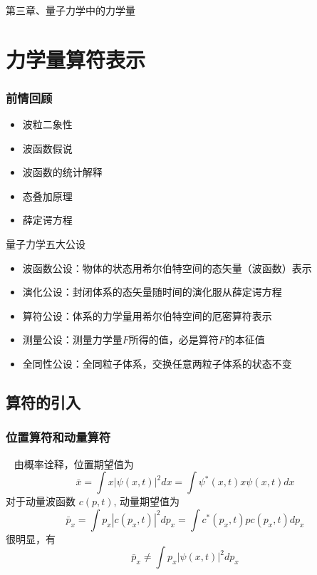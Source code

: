 \begin{frame} [plain]
    \frametitle{}
    \begin{center}
    { {\huge 第三章、量子力学中的力学量}}
    \end{center}  
    \addtocounter{framenumber}{-1}   
\end{frame}

\section{力学量算符表示}

\begin{frame}
    \frametitle{前情回顾}
    \begin{itemize}
        \item 波粒二象性
        \item 波函数假说
        \item 波函数的统计解释
        \item 态叠加原理
        \item 薛定谔方程
    \end{itemize}
\end{frame} 

\begin{frame}    
    \begin{atcbox}{量子力学五大公设}
\begin{itemize}
    \item 波函数公设：物体的状态用希尔伯特空间的态矢量（波函数）表示
    \item 演化公设：封闭体系的态矢量随时间的演化服从薛定谔方程
    \item 算符公设：体系的力学量用希尔伯特空间的厄密算符表示
    \item 测量公设：测量力学量$F$所得的值，必是算符$F$的本征值
    \item 全同性公设：全同粒子体系，交换任意两粒子体系的状态不变
\end{itemize}
    \end{atcbox}
\end{frame} 

\subsection{算符的引入}
\begin{frame} 
    \frametitle{位置算符和动量算符
    }
    \解~ 由概率诠释，位置期望值为
    \begin{equation*}
        \bar{x}=\int x|\psi(x, t)|^{2} d x=\int \psi^{*}(x, t) x \psi(x, t) d x
    \end{equation*}
    对于动量波函数 $c(p,t)$, 动量期望值为
    \begin{equation*}
        \bar{p}_x=\int p_x|c(p_x, t)|^{2} d p_x=\int c^{*}(p_x, t) p c(p_x, t) d p_x
    \end{equation*}
    很明显，有
    \begin{equation*}
        \bar{p}_x\neq\int p_x|\psi(x, t)|^{2} d p_x
    \end{equation*}
\end{frame} 

